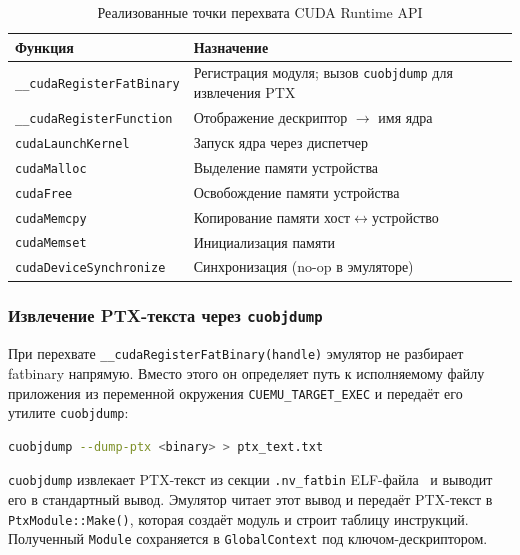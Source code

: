 \begin{table}[h]
  \caption{Реализованные точки перехвата CUDA Runtime API}
  \label{tab:intercept_points}
  \centering
  \begin{tabularx}{\linewidth}{lX}
    \toprule
    \textbf{Функция} & \textbf{Назначение} \\
    \midrule
    \texttt{\_\_cudaRegisterFatBinary}  & Регистрация модуля; вызов \texttt{cuobjdump} для извлечения PTX \\
    \texttt{\_\_cudaRegisterFunction}   & Отображение дескриптор $\to$ имя ядра \\
    \texttt{cudaLaunchKernel}           & Запуск ядра через диспетчер \\
    \texttt{cudaMalloc}                 & Выделение памяти устройства \\
    \texttt{cudaFree}                   & Освобождение памяти устройства \\
    \texttt{cudaMemcpy}                 & Копирование памяти хост$\leftrightarrow$устройство \\
    \texttt{cudaMemset}                 & Инициализация памяти \\
    \texttt{cudaDeviceSynchronize}      & Синхронизация (no-op в эмуляторе) \\
    \bottomrule
  \end{tabularx}
\end{table}

\subsubsection{Извлечение PTX-текста через \texttt{cuobjdump}}

При перехвате \texttt{\_\_cudaRegisterFatBinary(handle)} эмулятор
не разбирает fatbinary напрямую. Вместо этого он определяет путь
к исполняемому файлу приложения из переменной окружения
\texttt{CUEMU\_TARGET\_EXEC} и передаёт его утилите
\texttt{cuobjdump}:

\begin{lstlisting}[language=sh, caption={Извлечение PTX через cuobjdump}]
cuobjdump --dump-ptx <binary> > ptx_text.txt
\end{lstlisting}

\texttt{cuobjdump} извлекает PTX-текст из секции \texttt{.nv\_fatbin}
ELF-файла~\cite{Stolyarov2011} и выводит его в стандартный вывод. Эмулятор читает этот
вывод и передаёт PTX-текст в \texttt{PtxModule::Make()},
которая создаёт модуль и строит таблицу инструкций. Полученный \texttt{Module}
сохраняется в \texttt{GlobalContext} под ключом-дескриптором.

